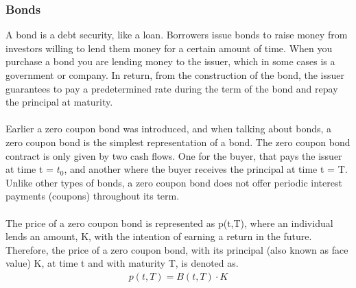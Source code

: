 \subsubsection{Bonds}
A bond is a debt security, like a loan. Borrowers issue bonds to raise money 
from investors willing to lend them money for a certain amount of time.
When you purchase a bond you are lending money to the issuer, which in 
some cases is a government or company. In return, from the construction of the 
bond, the issuer guarantees to pay a predetermined rate during the term of the bond
and repay the principal at maturity. 
\\\\
Earlier a zero coupon bond was introduced, and when talking about bonds, a zero coupon 
bond is the simplest representation of a bond. The zero coupon bond contract is 
only given by two cash flows. One for the buyer, that pays the issuer at time 
t = $t_0$, and another where the buyer receives the principal at time t = T.
Unlike other types of bonds, a zero coupon bond does not offer periodic 
interest payments (coupons) throughout its term. \cite{Bjork} 
\\\\
The price of a zero coupon bond is represented as 
p(t,T), where an individual lends an amount, K, with the intention of earning a
return in the future. Therefore, the price of a zero coupon bond, with 
its principal (also known as face value) K, at time t and with maturity 
T, is denoted as.
\begin{align*}
    p(t,T)= B(t,T)\cdot K
\end{align*}
